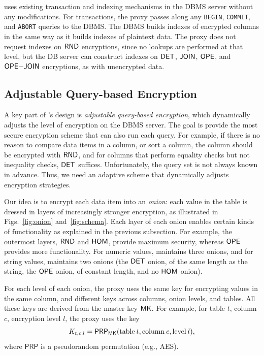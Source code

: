 \name{} uses existing transaction and indexing mechanisms in the DBMS
server without any modifications.  For transactions, the proxy passes
along any {\tt BEGIN}, {\tt COMMIT}, and {\tt ABORT} queries to the
DBMS\@.
The DBMS builds indexes of encrypted columns in the same way as it
builds indexes of plaintext data.  The proxy does not request indexes
on $\mathsf{RND}$ encryptions, since no lookups are performed at that level,
but the DB server can construct indexes on $\mathsf{DET}$, $\mathsf{JOIN}$, $\mathsf{OPE}$, and
$\mathsf{OPE}\mathrm{-}\mathsf{JOIN}$ encryptions, as with unencrypted data.

\subsection{Adjustable Query-based Encryption}
\label{ss:onion}

A key part of \name{}'s design is \textit{adjustable query-based
  encryption}, which dynamically adjusts the level of encryption on
the DBMS server.  The goal is provide the most secure encryption
scheme that can also run each query.  For example, if there
is no reason to compare data items in a column, or sort a column, the
column should be encrypted with $\mathsf{RND}$, and for columns that perform
equality checks but not inequality checks, $\mathsf{DET}$ suffices.
Unfortunately, the query set is not always known in advance.
Thus, we need an adaptive scheme that dynamically
adjusts encryption strategies.

Our idea is to encrypt each data item into an \textit{onion}:
each value in the table is dressed in layers of increasingly stronger
encryption, as illustrated in Figs.~\ref{fig:onion} and~\ref{fig:schema}. Each layer of
each onion enables certain kinds of functionality as explained in the
previous subsection.  For example, the outermost layers, $\mathsf{RND}$ and
$\mathsf{HOM}$, provide maximum security, whereas $\mathsf{OPE}$ provides more
functionality.  For numeric values, \name{} maintains three onions,
and for string values, \name{} maintains two onions (the $\mathsf{DET}$ onion,
of the same length as the string, the $\mathsf{OPE}$ onion, of constant length,
and no $\mathsf{HOM}$ onion).


For each level of each onion, the proxy uses the same key for
encrypting values in the same column, and different keys across
columns, onion levels, and tables.  All these keys are derived from
the master key $\mathsf{MK}$\@.  For example, for table $t$, column $c$,
encryption level $l$, the proxy uses the key
\begin{equation}\label{eq:columnkey}
K_{t, c, l} = \mathsf{PRP}_{\mathsf{MK}} (\mathrm{table}\>t, \mathrm{column}\>c,
    \mathrm{level}\>l),
\end{equation}
where $\mathsf{PRP}$ is a pseudorandom permutation (e.g., AES).

